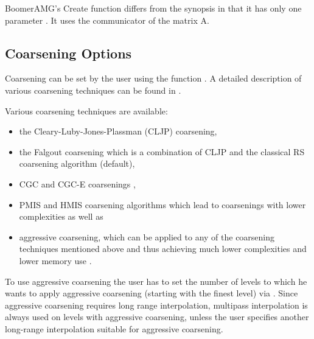 BoomerAMG's Create function differs from the synopsis in that it has only one parameter
. It uses the communicator 
of the matrix A.


\subsection{Coarsening Options}

Coarsening can be set by the user using the function . A detailed description of various coarsening techniques can be found in \cite{VEHenson_UMYang_2002,UMYang_2005}.

Various coarsening techniques are available:
\begin{itemize}
\item the Cleary-Luby-Jones-Plassman (CLJP) coarsening,
\item the Falgout coarsening which is a combination of CLJP and the
classical RS coarsening algorithm (default),
\item CGC and CGC-E coarsenings \cite{Griebela_1, Griebel_2},
\item PMIS and HMIS coarsening algorithms which lead to coarsenings with lower complexities \cite{DeSterck_Yang_Heys_2004}
as well as
\item aggressive coarsening, which can be applied to any of the coarsening techniques mentioned above and thus achieving much lower complexities and lower memory use \cite{Stueben_1999}.
\end{itemize}
To use aggressive coarsening the user has to set the number of levels to which he wants to apply
aggressive coarsening (starting with the finest level) 
via . Since aggressive coarsening requires long range
interpolation, multipass interpolation is always used on levels with aggressive coarsening, unless the user specifies another long-range interpolation suitable for aggressive coarsening.

